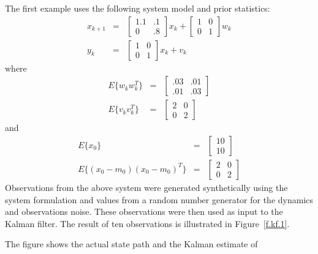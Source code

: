	The first example uses the following system model and prior 
statistics:
%
\begin{eqnarray}
x_{k+1}&=&\left[\begin{array}{cc}
              1.1 & .1\\
              0   & .8\end{array}\right]x_k+
         \left[\begin{array}{cc}
              1 & 0\\
              0 & 1\end{array}\right]w_k\nonumber\\
y_k&=&\left[\begin{array}{cc}
              1 & 0\\
              0 & 1\end{array}\right]x_k+v_k\nonumber
\end{eqnarray}
%
where
%
\begin{eqnarray}
E\{w_kw_k^T\}&=&\left[\begin{array}{cc}
              .03 & .01\\
              .01 & .03\end{array}\right]\nonumber\\
E\{v_kv_k^T\}&=&\left[\begin{array}{cc}
              2 & 0\\
              0 & 2\end{array}\right]\nonumber
\end{eqnarray}
%
and
%
\begin{eqnarray}
E\{x_0\}&=&\left[\begin{array}{c}
              10\\
              10\end{array}\right]\nonumber\\
E\{(x_0-m_0)(x_0-m_0)^T\}&=&\left[\begin{array}{cc}
              2 & 0\\
              0 & 2\end{array}\right]\nonumber
\end{eqnarray}
%
Observations from the above system were generated synthetically
using the system formulation and values from a random number generator
for the dynamics and observations noise.  These observations were then
used as input to the Kalman filter.  The result of ten observations is
illustrated in Figure~\ref{f.kf.1}.
%

%
The figure shows the actual state path and the Kalman estimate of
